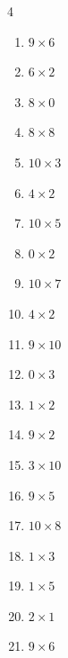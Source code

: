 \begin{multicols}{4}
\begin{enumerate}
  \item $9\times 6$
        \phantom{$=54$}

  \item $6\times 2$
        \phantom{$=12$}

  \item $8\times 0$
        \phantom{$=0$}

  \item $8\times 8$
        \phantom{$=64$}

  \item $10\times 3$
        \phantom{$=30$}

  \item $4\times 2$
        \phantom{$=8$}

  \item $10\times 5$
        \phantom{$=50$}

\columnbreak %

  \item $0\times 2$
        \phantom{$=0$}

  \item $10\times 7$
        \phantom{$=70$}

  \item $4\times 2$
        \phantom{$=8$}

  \item $9\times 10$
        \phantom{$=90$}

  \item $0\times 3$
        \phantom{$=0$}

  \item $1\times 2$
        \phantom{$=2$}

  \item $9\times 2$
        \phantom{$=18$}

  \item $3\times 10$
        \phantom{$=30$}

  \item $9\times 5$
        \phantom{$=45$}

  \item $10\times 8$
        \phantom{$=80$}

  \item $1\times 3$
        \phantom{$=3$}

  \item $1\times 5$
        \phantom{$=5$}

  \item $2\times 1$
        \phantom{$=2$}

  \item $9\times 6$
        \phantom{$=54$}


\end{enumerate}
\end{multicols}
